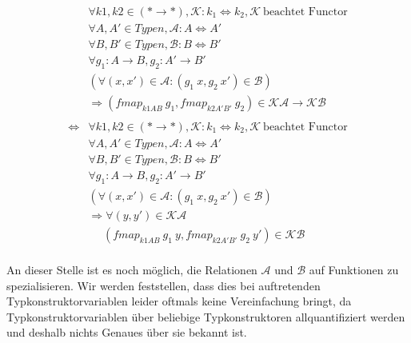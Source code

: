 
\begin{align*}
&\forall k1, k2 \in (* \rightarrow *), \mathcal{K} : k_1 \Leftrightarrow k_2, \mathcal{K}~\text{beachtet Functor} \\
&\forall A, A' \in Typen, \mathcal{A} : A \Leftrightarrow A' \\
&\forall B, B' \in Typen, \mathcal{B} : B \Leftrightarrow B' \\
&\forall g_1 : A \rightarrow B, g_2 : A' \rightarrow B' \\
&(\forall (x, x') \in \mathcal{A}: (g_1\ x, g_2\ x') \in \mathcal{B})\\
&\Rightarrow (fmap_{k1 A B}\ g_1, fmap_{k2 A' B'}\ g_2) \in \mathcal{K} \mathcal{A} \rightarrow \mathcal{K} \mathcal{B} \\
&\\
\Leftrightarrow &\forall k1, k2 \in (* \rightarrow *), \mathcal{K} : k_1 \Leftrightarrow k_2, \mathcal{K}~\text{beachtet Functor} \\
&\forall A, A' \in Typen, \mathcal{A} : A \Leftrightarrow A' \\
&\forall B, B' \in Typen, \mathcal{B} : B \Leftrightarrow B' \\
&\forall g_1 : A \rightarrow B, g_2 : A' \rightarrow B' \\
&(\forall (x, x') \in \mathcal{A}: (g_1\ x, g_2\ x') \in \mathcal{B})\\
&\Rightarrow \forall (y, y') \in \mathcal{K} \mathcal{A} \\
&\ \ \ \ \ \ (fmap_{k1 A B}\ g_1\ y, fmap_{k2 A' B'}\ g_2\ y') \in \mathcal{K} \mathcal{B}\\
\end{align*}


An dieser Stelle ist es noch möglich, die Relationen $\mathcal{A}$ und $\mathcal{B}$ auf Funktionen zu spezialisieren. Wir werden
feststellen, dass dies bei auftretenden Typkonstruktorvariablen leider oftmals keine Vereinfachung bringt, da Typkonstruktorvariablen
über beliebige Typkonstruktoren allquantifiziert werden und deshalb nichts Genaues über sie bekannt ist.

